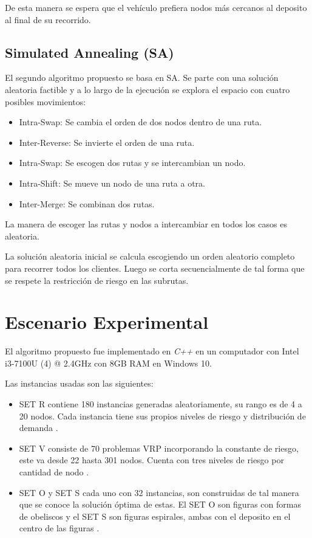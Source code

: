 \documentclass[conference]{IEEEtran}
\begin{document}
De esta manera se espera que el vehículo prefiera nodos más cercanos al deposito al final de su recorrido.

\subsection{Simulated Annealing (SA)}

El segundo algoritmo propuesto se basa en SA. Se parte con una solución aleatoria factible y a lo largo de la ejecución se explora el espacio con cuatro posibles movimientos:


\begin{itemize}
    \item Intra-Swap: Se cambia el orden de dos nodos dentro de una ruta.
    \item Inter-Reverse: Se invierte el orden de una ruta.
    \item Intra-Swap: Se escogen dos rutas y se intercambian un nodo.
    \item Intra-Shift: Se mueve un nodo de una ruta a otra.
    \item Inter-Merge: Se combinan dos rutas.
\end{itemize}

La manera de escoger las rutas y nodos a intercambiar en todos los casos es aleatoria. 

La solución aleatoria inicial se calcula escogiendo un orden aleatorio completo para recorrer todos los clientes. Luego se corta secuencialmente de tal forma que se respete la restricción de riesgo en las subrutas.



\section{Escenario Experimental}

El algoritmo propuesto fue implementado en \textit{C++} en un computador con Intel i3-7100U (4) @ 2.4GHz con 8GB RAM en  Windows 10.

Las instancias usadas son las siguientes:

\begin{itemize}
    \item SET R contiene 180 instancias generadas aleatoriamente, su rango es de 4 a 20 nodos. Cada instancia tiene sus propios niveles de riesgo y distribución de demanda \cite{TALARICO2015457}.
    \item SET V consiste de 70 problemas VRP incorporando la constante de riesgo, este va desde 22 hasta 301 nodos. Cuenta con tres niveles de riesgo por cantidad de nodo \cite{TALARICO2015457}.
    \item SET O y SET S cada uno con 32 instancias, son construidas de tal manera que se conoce la solución óptima de estas. El SET O son figuras con formas de obeliscos y el SET S son figuras espirales, ambas con el deposito en el centro de las figuras \cite{TALARICO2017547}.
\end{itemize}
\end{document}

